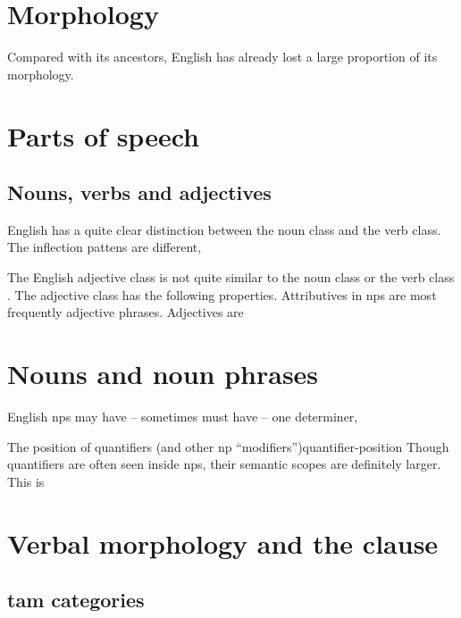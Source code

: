 \documentclass[UTF8, a4paper, oneside, scheme=plain]{ctexrep}
\newcommand*{\citepage}[1]{p.~{#1}}
\begin{document}
\section{Morphology}

Compared with its ancestors, 
English has already lost a large proportion of its morphology.


\section{Parts of speech}


\subsection{Nouns, verbs and adjectives}

English has a quite clear distinction between the noun class and the verb class.
The inflection pattens are different, 

The English adjective class is not quite similar to the noun class or the verb class 
\citep[\citepage{73}]{dixon2010basic2}.
The adjective class has the following properties.
Attributives in \acs{np}s are most frequently adjective phrases.
Adjectives are 

\section{Nouns and noun phrases}

English \acs{np}s may have -- sometimes must have -- 
one determiner, 

\begin{theorybox}{The position of quantifiers (and other \acs{np} ``modifiers'')}{quantifier-position}
    Though quantifiers are often seen inside \acs{np}s,
    their semantic scopes are definitely larger.
    This is 
\end{theorybox}

\section{Verbal morphology and the clause}

\subsection{\acs{tam} categories}
\end{document}
